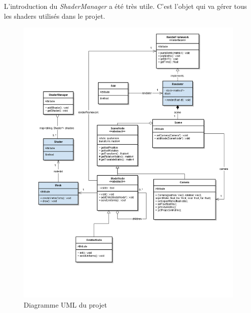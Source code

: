 L'introduction du \emph{ShaderManager} a été très utile. C'est l'objet qui va gérer tous les
shaders utilisés dans le projet.

\begin{figure}[h]
	\begin{center}
		\includegraphics[width=\textwidth]{img/UML.png}
	\end{center}
	\caption{Diagramme UML du projet}
\end{figure}

